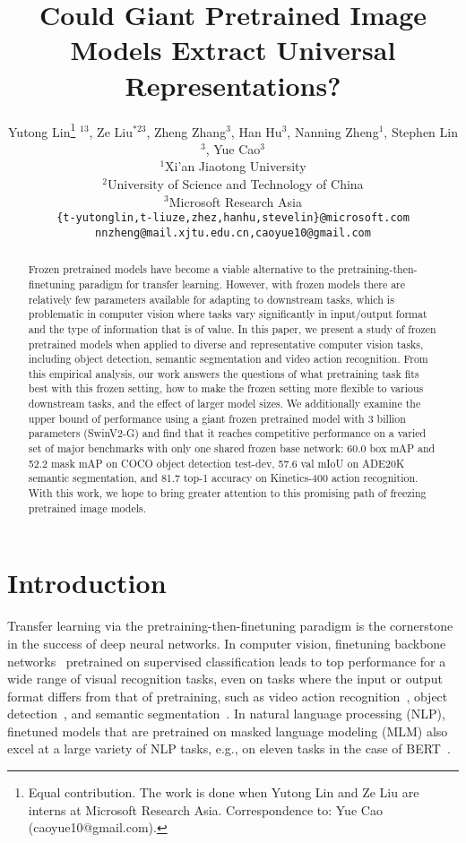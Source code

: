 \documentclass{article}
\title{Could Giant Pretrained Image Models Extract Universal Representations?}
\author{Yutong Lin\thanks{Equal contribution. The work is done when Yutong Lin and Ze Liu are interns at Microsoft Research Asia. Correspondence to: Yue Cao (caoyue10@gmail.com).}\hspace{0.4mm} $^{13}$, Ze Liu$^{*23}$, Zheng Zhang$^{3}$, Han Hu$^{3}$, Nanning Zheng$^{1}$, Stephen Lin$^{3}$, Yue Cao$^{3}$\\
  $^1$Xi'an Jiaotong University\\
  $^2$University of Science and Technology of China\\
  $^3$Microsoft Research Asia\\
  \texttt{\{t-yutonglin,t-liuze,zhez,hanhu,stevelin\}@microsoft.com} \\
  \texttt{nnzheng@mail.xjtu.edu.cn,caoyue10@gmail.com}
}
\begin{document}
\maketitle


\begin{abstract}
Frozen pretrained models have become a viable alternative to the pretraining-then-finetuning paradigm for transfer learning. However, with frozen models there are relatively few parameters available for adapting to downstream tasks, which is problematic in computer vision where tasks vary significantly in input/output format and the type of information that is of value. In this paper, we present a study of frozen pretrained models when applied to diverse and representative computer vision tasks, including object detection, semantic segmentation and video action recognition. From this empirical analysis, our work answers the questions of what pretraining task fits best with this frozen setting, how to make the frozen setting more flexible to various downstream tasks, and the effect of larger model sizes. We additionally examine the upper bound of performance using a giant frozen pretrained model with 3 billion parameters (SwinV2-G) and find that it reaches competitive performance on a varied set of major benchmarks with only one shared frozen base network: 60.0 box mAP and 52.2 mask mAP on COCO object detection test-dev, 57.6 val mIoU on ADE20K semantic segmentation, and 81.7 top-1 accuracy on Kinetics-400 action recognition. With this work, we hope to bring greater attention to this promising path of freezing pretrained image models.
\end{abstract}

\section{Introduction}
Transfer learning via the pretraining-then-finetuning paradigm is the cornerstone in the success of deep neural networks. In computer vision, finetuning backbone networks~\cite{alexnet,he2016resnet,dosovitskiy2020vit,liu2021swin} pretrained on supervised classification leads to top performance for a wide range of visual recognition tasks, even on tasks where the input or output format differs from that of pretraining, such as video action recognition~\cite{kay2017kinetics}, object detection~\cite{lin2014coco}, and semantic segmentation~\cite{zhou2018ade}.
In natural language processing (NLP), finetuned models that are pretrained on masked language modeling (MLM) also excel at a large variety of NLP tasks, e.g., on eleven tasks in the case of BERT~\cite{devlin2018bert}.
\end{document}

